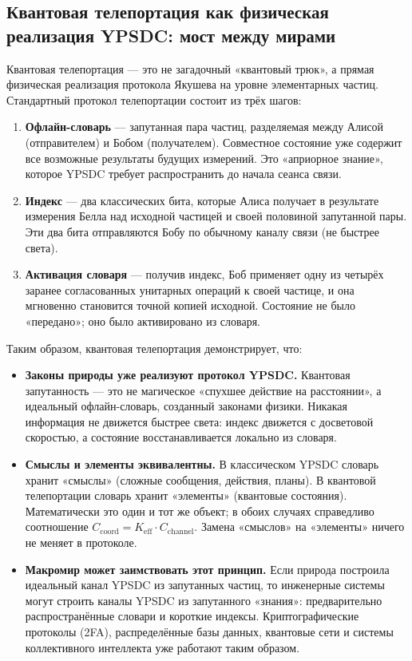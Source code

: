 \documentclass[12pt,a4paper]{article}
\theoremstyle{remark}
\begin{document}
	\subsection{Квантовая телепортация как физическая реализация YPSDC: мост между мирами}
	
	Квантовая телепортация — это не загадочный «квантовый трюк», а прямая физическая реализация протокола Якушева на уровне элементарных частиц. Стандартный протокол телепортации состоит из трёх шагов:
	
	\begin{enumerate}
		\item \textbf{Офлайн-словарь} — запутанная пара частиц, разделяемая между Алисой (отправителем) и Бобом (получателем). Совместное состояние уже содержит все возможные результаты будущих измерений. Это «априорное знание», которое YPSDC требует распространить до начала сеанса связи.
		\item \textbf{Индекс} — два классических бита, которые Алиса получает в результате измерения Белла над исходной частицей и своей половиной запутанной пары. Эти два бита отправляются Бобу по обычному каналу связи (не быстрее света).
		\item \textbf{Активация словаря} — получив индекс, Боб применяет одну из четырёх заранее согласованных унитарных операций к своей частице, и она мгновенно становится точной копией исходной. Состояние не было «передано»; оно было активировано из словаря.
	\end{enumerate}
	
	Таким образом, квантовая телепортация демонстрирует, что:
	
	\begin{itemize}
		\item \textbf{Законы природы уже реализуют протокол YPSDC.} Квантовая запутанность — это не магическое «спухшее действие на расстоянии», а идеальный офлайн-словарь, созданный законами физики. Никакая информация не движется быстрее света: индекс движется с досветовой скоростью, а состояние восстанавливается локально из словаря.
		\item \textbf{Смыслы и элементы эквивалентны.} В классическом YPSDC словарь хранит «смыслы» (сложные сообщения, действия, планы). В квантовой телепортации словарь хранит «элементы» (квантовые состояния). Математически это один и тот же объект; в обоих случаях справедливо соотношение \( C_{\mathrm{coord}} = K_{\mathrm{eff}} \cdot C_{\mathrm{channel}} \). Замена «смыслов» на «элементы» ничего не меняет в протоколе.
		\item \textbf{Макромир может заимствовать этот принцип.} Если природа построила идеальный канал YPSDC из запутанных частиц, то инженерные системы могут строить каналы YPSDC из запутанного «знания»: предварительно распространённые словари и короткие индексы. Криптографические протоколы (2FA), распределённые базы данных, квантовые сети и системы коллективного интеллекта уже работают таким образом.
	\end{itemize}
	
\end{document}
